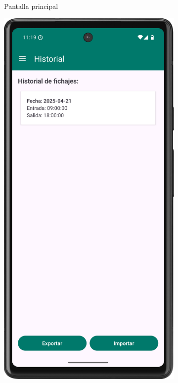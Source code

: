 \begin{figure}[H]
\begin{subfigure}[b]{0.22\textwidth}
         \caption{Pantalla principal}
         \label{fig:fichando}
     \end{subfigure}
     \hfill
     \begin{subfigure}[b]{0.22\textwidth}
         \centering
         \includegraphics[width=\textwidth]{root/historial.png}

\end{subfigure}
\end{figure}
